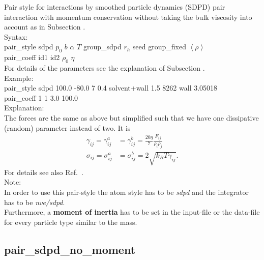 Pair style for interactions by smoothed particle dynamics (SDPD) pair interaction with momentum conservation without taking the bulk viscosity into account as in Subsection .
\\[2ex]
Syntax:
\\[1ex]
pair\_style      sdpd $p_0$ $b$ $\alpha$ $T$ group\_sdpd $r_h$ seed group\_fixed $\left< \rho \right>$
\\[1ex]
pair\_coeff      id1 id2 $\rho_0$ $\eta$\\[2ex]
For details of the parameters see the explanation of Subsection .\\[2ex]
Example:
\\[0.5ex]
pair\_style      sdpd 100.0 -80.0 7 0.4 solvent+wall 1.5 8262 wall 3.05018
\\[1ex]
pair\_coeff      1 1 3.0 100.0
\\[2ex]
Explanation:\\
The forces are the same as above but simplified such that we have one dissipative (random) parameter instead of two. 
It is  
\begin{align}\label{eq:singlep}
	\gamma_{ij} = \gamma^a_{ij} &= \gamma^b_{ij} = \frac{20\eta}{7}\frac{F_{ij}}{\rho_i\rho_j}  \\
  \sigma_{ij} = \sigma^a_{ij} &=\sigma^b_{ij} = 2\sqrt{k_BT\gamma_{ij}}. \nonumber
\end{align}
For details see also Ref.~\cite{Mueller_SDPD_2015}.\\[2ex]
Note:\\
In order to use this pair-style the atom style has to be \textit{sdpd} and the integrator has to be \textit{nve/sdpd}.\\ 
Furthermore, a \textbf{moment of inertia} has to be set in the input-file or the data-file for every particle type similar to the mass.


\subsection{pair\_sdpd\_no\_moment}\label{sec:pair/sdpd/nomoment}

